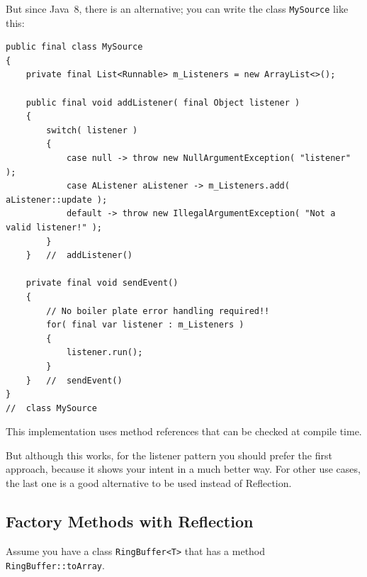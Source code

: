 But since Java~8, there is an alternative; you can write the class \lstinline|MySource| like this:
\begin{lstlisting}
public final class MySource
{
    private final List<Runnable> m_Listeners = new ArrayList<>();
    
    public final void addListener( final Object listener )
    {
        switch( listener )
        {
            case null -> throw new NullArgumentException( "listener" );
            case AListener aListener -> m_Listeners.add( aListener::update );
            default -> throw new IllegalArgumentException( "Not a valid listener!" );
        }
    }   //  addListener()
    
    private final void sendEvent()
    {
        // No boiler plate error handling required!!
        for( final var listener : m_Listeners )
        {
            listener.run();
        }
    }   //  sendEvent()
}
//  class MySource
\end{lstlisting}
This implementation uses method references\autocite{ORACLE_DOC_LANGUAGE_SPECIFICATION:MethodReference} that can be checked at compile time.

But although this works, for the listener pattern you should prefer the first approach, because it shows your intent in a much better way. For other use cases, the last one is a good alternative to be used instead of Reflection.


\subsection{Factory Methods with Reflection}
Assume you have a class \lstinline|RingBuffer<T>| that has a method \lstinline|RingBuffer::toArray|.

